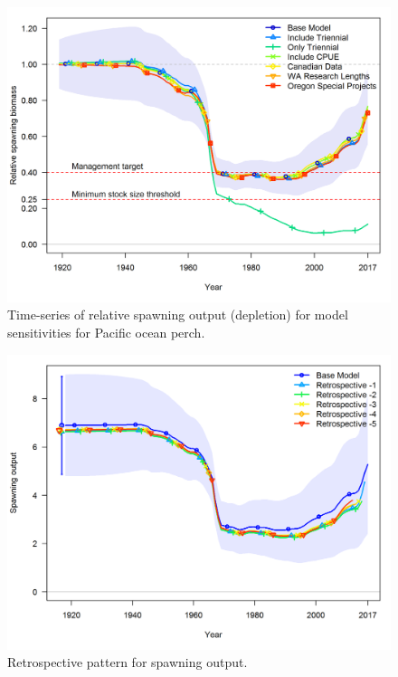 \documentclass[12pt,]{article}
\begin{document}
\FloatBarrier

\begin{figure}
\centering
\includegraphics{Figures/depl_sens2.png}
\caption{Time-series of relative spawning output (depletion) for model
sensitivities for Pacific ocean perch. \label{fig:sens2_depl}}
\end{figure}

\FloatBarrier

\begin{figure}
\centering
\includegraphics{Figures/compare2_spawnbio_uncertainty.png}
\caption{Retrospective pattern for spawning output.
\label{fig:retro_sb}}
\end{figure}
\end{document}
